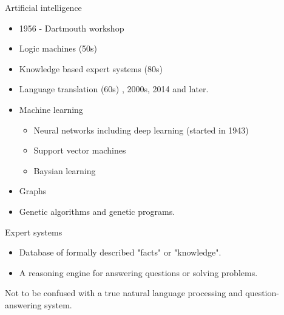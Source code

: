\begin{frame}{Artificial intelligence}
	\begin{itemize}
		\item 1956 - Dartmouth workshop 
		\item Logic machines (50s)
		\item Knowledge based expert systems (80s)
		\item Language translation (60s) , 2000s, 2014 and later.  
		\item Machine learning 
			\begin{itemize}
				\item Neural networks including deep learning (started in 1943)
				\item Support vector machines 
				\item Baysian learning   
			\end{itemize}
		\item Graphs
		\item Genetic algorithms and genetic programs.
	\end{itemize}
\end{frame}


\begin{frame}{Expert systems}
		\begin{itemize}
			\item Database of formally described "facts" or "knowledge". 
			\item A reasoning engine for answering questions or solving problems.  
		\end{itemize}
	Not to be confused with a true natural language processing and 
	question-answering system. 
\end{frame}

